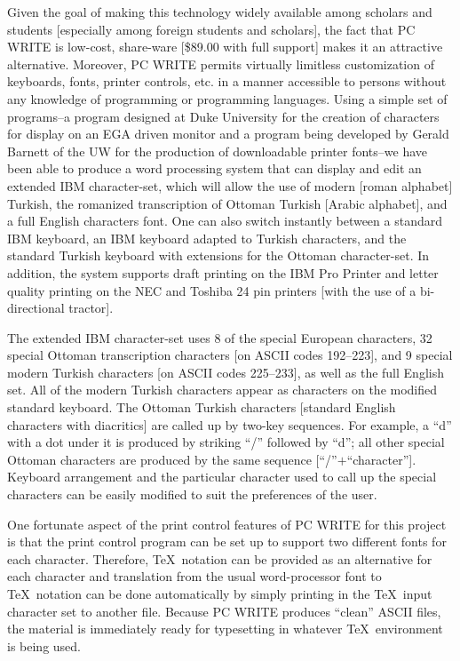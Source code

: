         Given the goal of making this technology widely
available among scholars and students [especially among
foreign students and scholars], the fact that PC WRITE is
low-cost, share-ware [\$89.00 with full support] makes it an
attractive alternative.  Moreover, PC WRITE permits
virtually limitless customization of keyboards, fonts,
printer controls, etc. in a manner accessible to persons
without any knowledge of programming or programming
languages.  Using a simple set of programs--a program
designed at Duke University for the creation of
characters for display on an EGA driven monitor and a
program being developed by Gerald Barnett of the UW for
the production of downloadable printer fonts--we have
been able to produce a word processing system that can
display and edit an extended IBM character-set, which
will allow the use of modern [roman alphabet] Turkish,
the romanized transcription of Ottoman Turkish [Arabic
alphabet], and a full English characters font.  One can
also switch instantly between a standard IBM
keyboard, an IBM keyboard adapted to Turkish
characters, and the standard Turkish keyboard with
extensions for the Ottoman character-set.  In addition,
the system supports draft printing on the IBM Pro Printer
and letter quality printing on the NEC and Toshiba 24 pin
printers [with the use of a bi-directional tractor].

        The extended IBM character-set uses 8 of the
special European characters, 32 special Ottoman
transcription characters [on ASCII codes 192--223], and 9
special modern Turkish characters [on ASCII codes
225--233], as well as the full English set.  All of the
modern Turkish characters appear as characters on the
modified standard keyboard.  The Ottoman Turkish
characters [standard English characters with diacritics]
are called up by two-key sequences.  For example, a ``d''
with a dot under it is produced by striking ``/'' followed
by ``d''; all other special Ottoman characters are produced
by the same sequence [``/''$+$``character''].  Keyboard
arrangement and the particular character used to call up
the special characters can be easily modified to suit the
preferences of the user.

        One fortunate aspect of the print control features of PC
WRITE for this project
is that the print control program can be set up to
support two different fonts for each character.
Therefore, \TeX\ notation can be provided as an alternative
for each character and translation from the usual
word-processor font to \TeX\ notation can be done
automatically by simply printing in the \TeX\ input character set to
another file.  Because PC WRITE produces ``clean'' ASCII
files, the material is immediately ready for typesetting
in whatever \TeX\ environment is being used.

